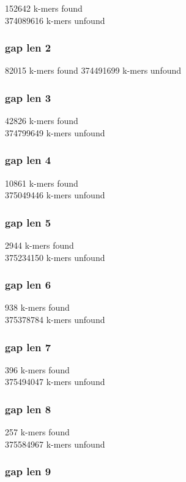 \documentclass[12pt]{article}
\begin{document}
152642 k-mers found \\
374089616 k-mers unfound

\subsubsection{gap len 2}

82015 k-mers found
374491699 k-mers unfound

\subsubsection{gap len 3}

42826 k-mers found \\
374799649 k-mers unfound

\subsubsection{gap len 4}

10861 k-mers found \\
375049446 k-mers unfound

\subsubsection{gap len 5}

2944 k-mers found \\
375234150 k-mers unfound

\subsubsection{gap len 6}

938 k-mers found \\
375378784 k-mers unfound

\subsubsection{gap len 7}

396 k-mers found \\
375494047 k-mers unfound

\subsubsection{gap len 8}

257 k-mers found \\
375584967 k-mers unfound

\subsubsection{gap len 9}
\end{document}
